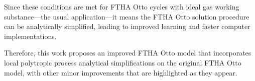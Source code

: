     Since these conditions are met for FTHA Otto cycles with ideal gas working substance---the usual application---it means  the
    FTHA  Otto  solution  procedure  can  be  analytically  simplified,  leading  to  improved  learning  and  faster   computer
    implementations.

    Therefore, this  work  proposes  an  improved  FTHA  Otto  model  that  incorporates  local  polytropic  process  analytical
    simplifications on the original FTHA Otto model, with other minor improvements that are highlighted as they appear.

